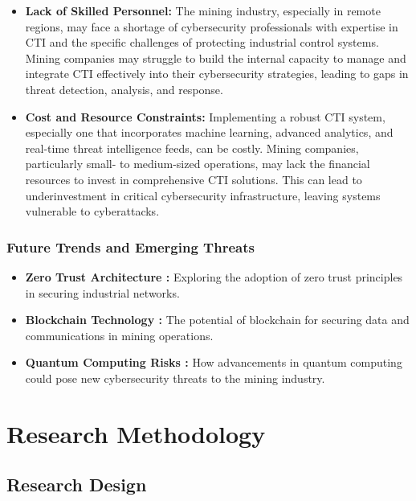 \documentclass[a4paper,twoside,12pt]{report}
\begin{document}
\begin{itemize}
    \item \textbf{Lack of Skilled Personnel:} The mining industry, especially in remote regions, may face a shortage of cybersecurity professionals with expertise in CTI and the specific challenges of protecting industrial control systems. Mining companies may struggle to build the internal capacity to manage and integrate CTI effectively into their cybersecurity strategies, leading to gaps in threat detection, analysis, and response.
    
    \item \textbf{Cost and Resource Constraints:} Implementing a robust CTI system, especially one that incorporates machine learning, advanced analytics, and real-time threat intelligence feeds, can be costly. Mining companies, particularly small- to medium-sized operations, may lack the financial resources to invest in comprehensive CTI solutions. This can lead to underinvestment in critical cybersecurity infrastructure, leaving systems vulnerable to cyberattacks.
\end{itemize}

\subsection*{Future Trends and Emerging Threats}
\begin{itemize}
    \item \textbf{Zero Trust Architecture \citet{stafford2020zero}:} Exploring the adoption of zero trust principles in securing industrial networks.
    \item \textbf{Blockchain Technology \citet{prakash2022blockchain}:} The potential of blockchain for securing data and communications in mining operations.
    \item \textbf{Quantum Computing Risks \citet{brooks2024inside}:} How advancements in quantum computing could pose new cybersecurity threats to the mining industry.
\end{itemize}

\chapter{Research Methodology}

\section{Research Design}
\end{document}
